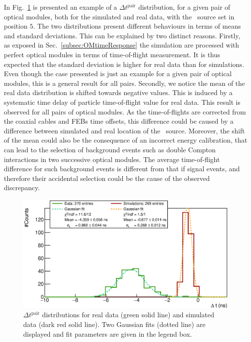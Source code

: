 In Fig.~\ref{fig:Co_deltat} is presented an example of a $\Delta t^{\text{pair}}$ distribution, for a given pair of optical modules, both for the simulated and real data, with the \Co\ source set in position $5$.
The two distributions present different behaviours in terms of means and standard deviations.
This can be explained by two distinct reasons.
Firstly, as exposed in Sec.~\ref{subsec:OMtimeResponse} the simulation are processed with perfect optical modules in terms of time-of-flight measurement.
It is thus expected that the standard deviation is higher for real data than for simulations.
Even though the case presented is just an example for a given pair of optical modules, this is a general result for all pairs.
Secondly, we notice the mean of the real data distribution is shifted towards negative values.
This is induced by a systematic time delay of particle time-of-flight value for real data.
This result is observed for all pairs of optical modules.
As the time-of-flights are corrected from the coaxial cables and FEBs time offsets, this difference could be caused by a difference between simulated and real location of the \Co\ source.
Moreover, the shift of the mean could also be the consequence of an incorrect energy calibration, that can lead to the selection of background events such as double Compton interactions in two successive optical modules.
The average time-of-flight difference for such background events is different from that if signal events, and therefore their accidental selection could be the cause of the observed discrepancy.
\begin{figure}[h]
  \centering
  \includegraphics[width=15cm]{commissioning/fig_commissioning/Co_deltat_distrib_ex.eps}
  \caption{$\Delta t^{\text{pair}}$ distributions for real data (green solid line) and simulated data (dark red solid line).
    Two Gaussian fits (dotted line) are displayed and fit parameters are given in the legend box.
    \label{fig:Co_deltat}}
\end{figure}

